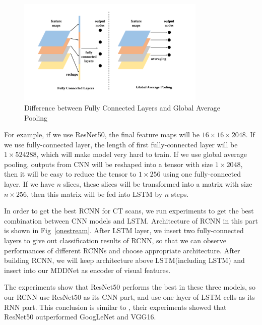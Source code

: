 \begin{figure}[htb]
    \centerline{\includegraphics[width=90mm]{gap.pdf}}
    \vspace{-0cm}
    \caption{Difference between Fully Connected Layers and Global Average Pooling}
    \vspace{-0cm}
    \label{gap}
    \end{figure}

For example, if we use ResNet50, the final feature maps will be $16 \times 16 \times 2048$. If we use fully-connected layer, the length of first fully-connected layer will be $1 \times 524288$, which will make model very hard to train. 
If we use global average pooling, outputs from CNN will be reshaped into a tensor with size $1 \times 2048$, then it will be easy to reduce the tensor to $1 \times 256$ using one fully-connected layer. If we have $n$ slices, these slices will be transformed into a matrix with size $n \times 256$, then this matrix will be fed into LSTM by $n$ steps.

In order to get the best RCNN for CT scans, we run experiments to get the best combination between CNN models and LSTM. Architecture of RCNN in this part is shown in Fig~\ref{onestream}. After LSTM layer, we insert two fully-connected layers to give out classification results of RCNN, so that we can observe performances of different RCNNs and choose appropriate architecture. After building RCNN, we will keep architecture above LSTM(including LSTM) and insert into our MDDNet as encoder of visual features.

The experiments show that ResNet50 performs the best in these three models, so our RCNN use ResNet50 as its CNN part, and use one layer of LSTM cells as its RNN part. This conclusion is similar to \cite{Wang2017ChestX}, their experiments showed that ResNet50 outperformed GoogLeNet and VGG16.

